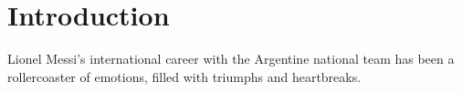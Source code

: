 
\section{Introduction}\label{sec:chap2_introduction}

Lionel Messi's international career with the Argentine national team has been
a rollercoaster of emotions, filled with triumphs and heartbreaks.
